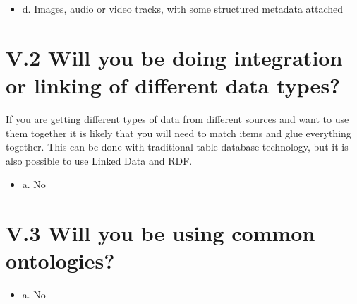 \documentclass[a4paper,12pt]{report}
\begin{document}
\begin{itemize}
  \item[\CheckmarkBold] d. Images, audio or video tracks, with some structured metadata attached
\end{itemize}








\section*{\protect\textcolor{colorSecId}{V.2} Will you be doing integration or linking of different data types?}

\label{83438863-0aa0-4458-b14b-2b2c0d4f811d.109ed7ea-ef1d-4719-b2b4-eb4f7202c65c}




\noindent
\begin{markdown}
If you are getting different types of data from different sources and want to use them together it is likely that you will need to match items and glue everything together. This can be done with traditional table database technology, but it is also possible to use Linked Data and RDF.
\end{markdown}



\begin{itemize}
  \item[\CheckmarkBold] a. No
\end{itemize}






\section*{\protect\textcolor{colorSecId}{V.3} Will you be using common ontologies?}

\label{83438863-0aa0-4458-b14b-2b2c0d4f811d.f67e1539-5c7d-4df7-8259-e4f2edfa2685}






\begin{itemize}
  \item[\CheckmarkBold] a. No
\end{itemize}
\end{document}
